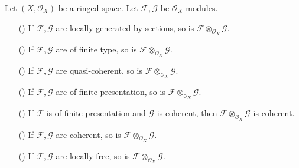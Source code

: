 \begin{proposition}
Let $(X,\mathscr{O}_X)$ be a ringed space. Let $\mathscr{F},\mathscr{G}$ be $\mathscr{O}_X$-modules.
\begin{itemize}
\item[(\rmnum{1})] If $\mathscr{F},\mathscr{G}$ are locally generated by sections, so is $\mathscr{F}\otimes_{\mathscr{O}_X}\mathscr{G}$.
\item[(\rmnum{2})] If $\mathscr{F},\mathscr{G}$ are of finite type, so is $\mathscr{F}\otimes_{\mathscr{O}_X}\mathscr{G}$.
\item[(\rmnum{3})] If $\mathscr{F},\mathscr{G}$ are quasi-coherent, so is $\mathscr{F}\otimes_{\mathscr{O}_X}\mathscr{G}$.
\item[(\rmnum{4})] If $\mathscr{F},\mathscr{G}$ are of finite presentation, so is $\mathscr{F}\otimes_{\mathscr{O}_X}\mathscr{G}$.
\item[(\rmnum{5})] If $\mathscr{F}$ is of finite presentation and $\mathscr{G}$ is coherent, then $\mathscr{F}\otimes_{\mathscr{O}_X}\mathscr{G}$ is coherent.
\item[(\rmnum{6})] If $\mathscr{F},\mathscr{G}$ are coherent, so is $\mathscr{F}\otimes_{\mathscr{O}_X}\mathscr{G}$.
\item[(\rmnum{7})] If $\mathscr{F},\mathscr{G}$ are locally free, so is $\mathscr{F}\otimes_{\mathscr{O}_X}\mathscr{G}$.
\end{itemize}
\end{proposition}
